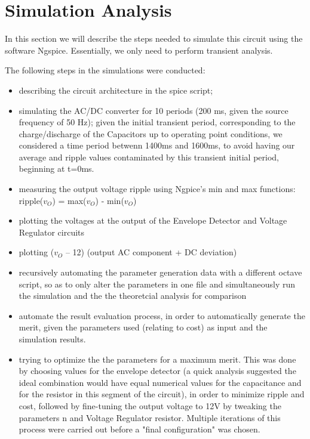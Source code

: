 \section{Simulation Analysis}
\label{sec:simulation}
In this section we will describe the steps needed to simulate this circuit using the software Ngspice. Essentially, we only need to perform transient analysis.

The following steps in the simulations were conducted: 
\begin{itemize}
	\item describing the circuit architecture in the spice script;
	\item simulating the AC/DC converter for 10 periods (200 ms, given the source frequency of 50 Hz); given the initial transient period, corresponding to the charge/discharge of the Capacitors up to operating point conditions, we considered a time period betwenn 1400ms and 1600ms, to avoid having our average and ripple values contaminated by this transient initial period, beginning at t=0ms.
	\item measuring the output voltage ripple using Ngpice’s min and
max functions: ripple($v_O$) = max($v_O$) - min($v_O$)
	\item plotting the voltages at the output of the Envelope Detector
and Voltage Regulator circuits
	\item plotting ($v_O$ – 12) (output AC component + DC deviation)
	\item recursively automating the parameter generation data with a different octave script, so as to only alter the parameters in one file and simultaneously run the simulation and the the theoretcial analysis for comparison
	\item automate the result evaluation process, in order to automatically generate the merit, given the parameters used (relating to cost) as input and the simulation results.
	\item trying to optimize the the parameters for a maximum merit. This was done by choosing values for the envelope detector (a quick analysis suggested the ideal combination would have equal numerical values for the capacitance and for the resistor in this segment of the circuit), in order to minimize ripple and cost, followed by fine-tuning the output voltage to 12V by tweaking the parameters n and Voltage Regulator resistor. Multiple iterations of this process were carried out before a "final configuration" was chosen.
	

\end{itemize}

